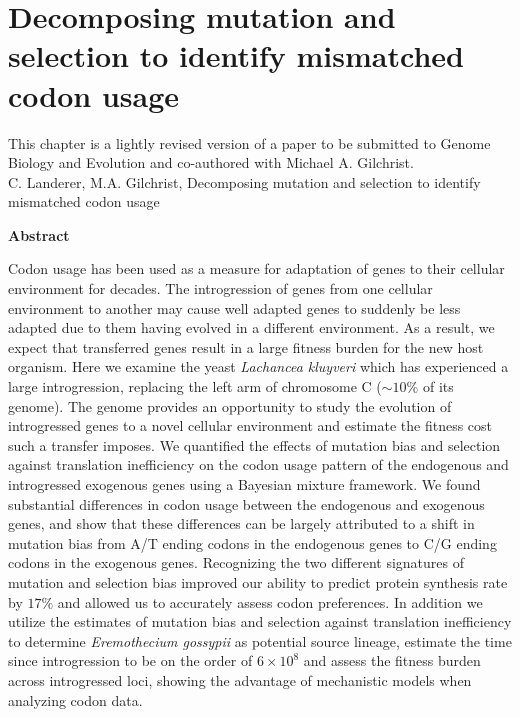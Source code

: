 \chapter{Decomposing mutation and selection to identify mismatched codon usage}
\label{ch:kluyveri}


This chapter is a lightly revised version of a paper to be submitted to Genome Biology and Evolution and co-authored with Michael A. Gilchrist.\\
\newline
\newline
C. Landerer, M.A. Gilchrist, Decomposing mutation and selection to identify mismatched codon usage

\clearpage
\pagebreak

\begin{center}\textbf{Abstract}\end{center}
Codon usage has been used as a measure for adaptation of genes to their cellular environment for decades. 
The introgression of genes from one cellular environment to another may cause well adapted genes to suddenly be less adapted due to them having evolved in a different environment.
As a result, we expect that transferred genes result in a large fitness burden for the new host organism.
Here we examine the yeast \textit{Lachancea kluyveri} which has experienced a large introgression, replacing the left arm of chromosome C ($\sim 10 \%$ of its genome).
The \kluyveri genome provides an opportunity to study the evolution of introgressed genes to a novel cellular environment and estimate the fitness cost such a transfer imposes.
We quantified the effects of mutation bias and selection against translation inefficiency on the codon usage pattern of the endogenous and introgressed exogenous genes using a Bayesian mixture framework.
We found substantial differences in codon usage between the endogenous and exogenous genes, and show that these differences can be largely attributed to a shift in mutation bias from A/T ending codons in the endogenous genes to C/G ending codons in the exogenous genes.
Recognizing the two different signatures of mutation and selection bias improved our ability to predict protein synthesis rate by $17 \%$ and allowed us to accurately assess codon preferences.
In addition we utilize the estimates of mutation bias and selection against translation inefficiency to determine \textit{Eremothecium gossypii} as potential source lineage, estimate the time since introgression to be on the order of $6\times 10^8$ and assess the fitness burden across introgressed loci, showing the advantage of mechanistic models when analyzing codon data.

